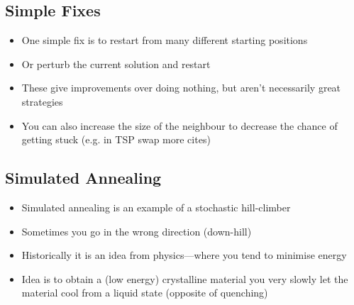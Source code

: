 
\begin{slide}
\section{Simple Fixes}

\begin{PauseHighLight}
  \begin{itemize}
  \item One simple fix is to restart from many different starting
    positions\pause
  \item Or perturb the current solution and restart\pause
  \item These give improvements over doing nothing, but aren't
    necessarily great strategies\pause
  \item You can also increase the size of the neighbour to decrease the
    chance of getting stuck (e.g. in TSP swap more cites)\pause
  \end{itemize}
\end{PauseHighLight}

\end{slide}

\Outline %

\begin{slide}
\section{Simulated Annealing}

\begin{PauseHighLight}
  \begin{itemize}
  \item Simulated annealing is an example of a stochastic
    hill-climber\pause 
  \item Sometimes you go in the wrong direction (down-hill)\pause
  \item Historically it is an idea from physics\pause---where you tend
    to minimise energy\pause
  \item Idea is to obtain a (low energy) crystalline material you very
    slowly let the material cool from a liquid state (opposite of
    quenching)\pause
  \end{itemize}
\end{PauseHighLight}

\end{slide}

